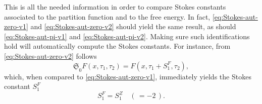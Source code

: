 \documentclass[11pt,a4paper]{article}
\begin{document}
This is all the needed information in order to compare Stokes constants associated to the partition function and to the free energy. In fact, \eqref{eq:Stokes-aut-zero-v1} and \eqref{eq:Stokes-aut-zero-v2} should yield the same result, as should \eqref{eq:Stokes-aut-pi-v1} and \eqref{eq:Stokes-aut-pi-v2}. Making sure such identifications hold will automatically compute the Stokes constants. For instance, from \eqref{eq:Stokes-aut-zero-v2} follows
%
\begin{equation}
\underline{\mathfrak{S}}_{0} F (x, \tau_1, \tau_2) = F \left(x, \tau_1+S_{1}^{F}, \tau_{2}\right), 
\end{equation}
%
\noindent
which, when compared to \eqref{eq:Stokes-aut-zero-v1}, immediately yields the Stokes constant $S_{1}^{F}$
%
\begin{equation}
\label{eq:Stokes-consts-relation-1}
S_{1}^{F} = S_{1}^{Z} \quad (\, = - 2\, ).
\end{equation}
\end{document}
